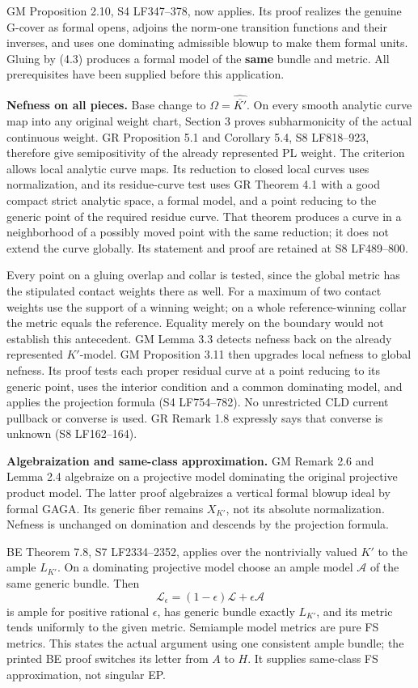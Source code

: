 \documentclass[
  10pt,
]{article}
\begin{document}
GM Proposition 2.10, S4 LF347--378, now applies. Its proof realizes the
genuine G-cover as formal opens, adjoins the norm-one transition
functions and their inverses, and uses one dominating admissible blowup
to make them formal units. Gluing by (4.3) produces a formal model of
the \textbf{same} bundle and metric. All prerequisites have been
supplied before this application.

\textbf{Nefness on all pieces.} Base change to
\(\Omega=\widehat{\overline{K'}}\). On every smooth analytic curve map
into any original weight chart, Section 3 proves subharmonicity of the
actual continuous weight. GR Proposition 5.1 and Corollary 5.4, S8
LF818--923, therefore give semipositivity of the already represented PL
weight. The criterion allows local analytic curve maps. Its reduction to
closed local curves uses normalization, and its residue-curve test uses
GR Theorem 4.1 with a good compact strict analytic space, a formal
model, and a point reducing to the generic point of the required residue
curve. That theorem produces a curve in a neighborhood of a possibly
moved point with the same reduction; it does not extend the curve
globally. Its statement and proof are retained at S8 LF489--800.

Every point on a gluing overlap and collar is tested, since the global
metric has the stipulated contact weights there as well. For a maximum
of two contact weights use the support of a winning weight; on a whole
reference-winning collar the metric equals the reference. Equality
merely on the boundary would not establish this antecedent. GM Lemma 3.3
detects nefness back on the already represented \(K'\)-model. GM
Proposition 3.11 then upgrades local nefness to global nefness. Its
proof tests each proper residual curve at a point reducing to its
generic point, uses the interior condition and a common dominating
model, and applies the projection formula (S4 LF754--782). No
unrestricted CLD current pullback or converse is used. GR Remark 1.8
expressly says that converse is unknown (S8 LF162--164).

\textbf{Algebraization and same-class approximation.} GM Remark 2.6 and
Lemma 2.4 algebraize on a projective model dominating the original
projective product model. The latter proof algebraizes a vertical formal
blowup ideal by formal GAGA. Its generic fiber remains \(X_{K'}\), not
its absolute normalization. Nefness is unchanged on domination and
descends by the projection formula.

BE Theorem 7.8, S7 LF2334--2352, applies over the nontrivially valued
\(K'\) to the ample \(L_{K'}\). On a dominating projective model choose
an ample model \(\mathcal A\) of the same generic bundle. Then
\[\mathcal L_\epsilon=(1-\epsilon)\mathcal L+\epsilon\mathcal A\] is
ample for positive rational \(\epsilon\), has generic bundle exactly
\(L_{K'}\), and its metric tends uniformly to the given metric.
Semiample model metrics are pure FS metrics. This states the actual
argument using one consistent ample bundle; the printed BE proof
switches its letter from \(A\) to \(H\). It supplies same-class FS
approximation, not singular EP.
\end{document}
